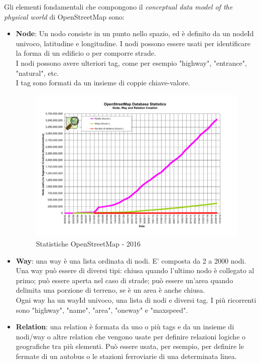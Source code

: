 \documentclass[12pt,a4paper,openright,twoside]{report}
\begin{document}
Gli elementi fondamentali che compongono il \textit{conceptual data model of the physical world} di OpenStreetMap sono:
\begin{itemize}
\item \textbf{Node}: Un nodo consiste in un punto nello spazio, ed è definito da un nodeId univoco, latitudine e longitudine. I nodi possono essere usati per identificare la forma di un edificio o per comporre strade.\\
I nodi possono avere ulteriori tag, come per esempio "highway", "entrance", "natural", etc.\\
I tag sono formati da un insieme di coppie chiave-valore. \\

\begin{figure}[h] 
\centering 
\includegraphics[scale=1]{fig3} 
\caption{Statistiche OpenStreetMap - 2016} 
\end{figure}
\item \textbf{Way}: una way è una lista ordinata di nodi. E' composta da 2 a 2000 nodi. Una way può essere di diversi tipi: chiusa quando l'ultimo nodo è collegato al primo; può essere aperta nel caso di strade; può essere un'area quando delimita una porzione di terreno, se è un area è anche chiusa.\\
Ogni way ha un wayId univoco, una lista di nodi e diversi tag. I più ricorrenti sono "highway", "name", "area", "oneway" e "maxspeed".
\item \textbf{Relation}: una relation è formata da uno o più tags e da un insieme di nodi/way o altre relation che vengono usate per definire relazioni logiche o geografiche tra più elementi. Può essere usata, per esempio, per definire le fermate di un autobus o le stazioni ferroviarie di una determinata linea.
\end{itemize}
\end{document}
